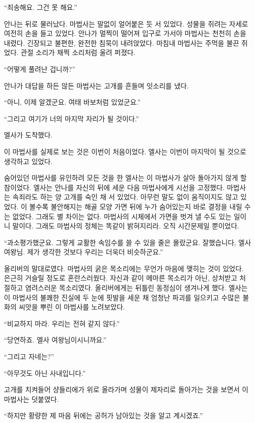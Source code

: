 ``죄송해요. 그건 못 해요.''

안나는 뒤로 물러났다. 마법사는 말없이 얼어붙은 듯 서 있었다. 성물을 쥐려는 자세로 여전히 손을 들고 있었다. 안나가 멀찍이 떨어져 입구로 가서야 마법사는 천천히 손을 내렸다. 긴장되고 불편한, 완전한 침묵이 내려앉았다. 마침내 마법사는 주먹을 불끈 쥐었다. 관절 소리가 채찍 소리처럼 울려 퍼졌다.

``어떻게 풀려난 겁니까?''

안나가 대답을 하든 않든 마법사는 고개를 흔들며 잇소리를 냈다.

``아니, 이제 알겠군요. 여태 바보처럼 있었군요.''

``그리고 여기가 너의 마지막 자리가 될 것이다.''

엘사가 도착했다.

\textbreak

이 마법사를 실제로 보는 것은 이번이 처음이었다. 엘사는 이번이 마지막이 될 것으로 생각하고 있었다.

숨어있던 마법사를 유인하려 모든 것을 한 엘사는 이 마법사가 살아 돌아가지 않게 할 참이었다. 엘사는 안나를 자신의 뒤에 세운 다음 마법사에게 시선을 고정했다. 마법사는 속죄라도 하는 양 고개를 숙인 채 서 있었다. 아무런 말도 없이 움직이지도 않고 있었다. 이 볼수록 불안해지는 해골 모양 가면 뒤에 누가 숨어있는지 바로 결정을 내릴 수는 없었다. 그래도 별 차이는 없다. 마법사의 시체에서 가면을 벗겨 낼 수도 있는 일이니 말이다. 그래도 마법사의 정체는 똑같이 밝혀지리라. 오직 시간문제일 뿐이었다.

``과소평가했군요. 그렇게 교활한 속임수를 쓸 수 있을 줄은 몰랐군요. 잘했습니다, 엘사 여왕님. 제가 생각한 것보다 우리는 더욱더 비슷하군요.''

올리버의 말대로였다. 마법사의 굵은 목소리에는 무언가 마음에 맺히는 것이 있었다. 은근히 거슬릴 정도로 혼란스러웠다. 자신과 같이 메마른 목소리가 아닌, 상처받고 처절하고 염려스러운 목소리였다. 올리버에게는 뒤틀린 동정심이 생겨나게 했다. 엘사는 이 마법사의 불쾌한 진실에 두 눈에 핏발을 세운 채 엄청난 파괴를 일으키고 수많은 불화의 씨앗을 뿌린 이 마법사를 노려보았다.

``비교하지 마라. 우리는 전혀 같지 않다.''

``당연하죠. 엘사 여왕님이시니까요.''

``그리고 자네는?''

``아무것도 아닌 사내입니다.''

고개를 치켜들어 샹들리에가 위로 올라가며 성물이 제자리로 돌아가는 것을 보면서 이 마법사는 덧붙였다.

``하지만 황량한 제 마음 뒤에는 공허가 남아있는 것을 알고 계시겠죠.''

